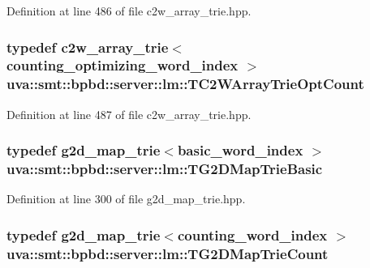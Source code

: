 Definition at line 486 of file c2w\+\_\+array\+\_\+trie.\+hpp.

\hypertarget{namespaceuva_1_1smt_1_1bpbd_1_1server_1_1lm_a3f802fb919db16970d4112d79cb94957}{}
\subsubsection[{T\+C2\+W\+Array\+Trie\+Opt\+Count}]{\setlength{\rightskip}{0pt plus 5cm}typedef {\bf c2w\+\_\+array\+\_\+trie}$<${\bf counting\+\_\+optimizing\+\_\+word\+\_\+index} $>$ {\bf uva\+::smt\+::bpbd\+::server\+::lm\+::\+T\+C2\+W\+Array\+Trie\+Opt\+Count}}\label{namespaceuva_1_1smt_1_1bpbd_1_1server_1_1lm_a3f802fb919db16970d4112d79cb94957}


Definition at line 487 of file c2w\+\_\+array\+\_\+trie.\+hpp.

\hypertarget{namespaceuva_1_1smt_1_1bpbd_1_1server_1_1lm_a6fa183ee690c48a8ae4a1833aaa02dc6}{}
\subsubsection[{T\+G2\+D\+Map\+Trie\+Basic}]{\setlength{\rightskip}{0pt plus 5cm}typedef {\bf g2d\+\_\+map\+\_\+trie}$<${\bf basic\+\_\+word\+\_\+index} $>$ {\bf uva\+::smt\+::bpbd\+::server\+::lm\+::\+T\+G2\+D\+Map\+Trie\+Basic}}\label{namespaceuva_1_1smt_1_1bpbd_1_1server_1_1lm_a6fa183ee690c48a8ae4a1833aaa02dc6}


Definition at line 300 of file g2d\+\_\+map\+\_\+trie.\+hpp.

\hypertarget{namespaceuva_1_1smt_1_1bpbd_1_1server_1_1lm_a2e185a93cd3a0d6a1dda4362ba9001cb}{}
\subsubsection[{T\+G2\+D\+Map\+Trie\+Count}]{\setlength{\rightskip}{0pt plus 5cm}typedef {\bf g2d\+\_\+map\+\_\+trie}$<${\bf counting\+\_\+word\+\_\+index} $>$ {\bf uva\+::smt\+::bpbd\+::server\+::lm\+::\+T\+G2\+D\+Map\+Trie\+Count}}\label{namespaceuva_1_1smt_1_1bpbd_1_1server_1_1lm_a2e185a93cd3a0d6a1dda4362ba9001cb}


